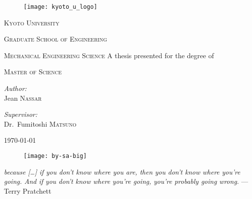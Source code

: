\begin{titlepage}
  \begin{center}
    \noindent

    \begin{figure}[h]
      \centering
      \texttt{[image: kyoto\_u\_logo]}
    \end{figure}
    \textsc{\LARGE Kyoto University}
    
    \textsc{\Large Graduate School of Engineering}

    \textsc{\large Mechanical Engineering Science}
    \vfill\vfill
    \textsc{\large \mytitle}  %
    \vfill\vfill
    {\large A thesis presented for the degree of}

    \textsc{\large Master of Science}
    \vfill\vfill
    \begin{minipage}[t]{0.4\textwidth}
      \begin{flushleft}
	\emph{Author:}\\
	Jean \textsc{Nassar}
      \end{flushleft}
    \end{minipage}
    \begin{minipage}[t]{0.4\textwidth}
      \begin{flushright}
	\emph{Supervisor:}\\
	Dr.~Fumitoshi \textsc{Matsuno}
      \end{flushright}
    \end{minipage}
    \vfill
    \today
    \begin{figure}[h]
      \centering
      \texttt{[image: by-sa-big]}
    \end{figure}
  \end{center}
\end{titlepage}

\thispagestyle{empty}
  \null{}
    \begin{flushright}
      \emph{
	because [\ldots] if you don't know where you are, then you don't know where you're going.
	And if you don't know where you're going, you're probably going wrong.
      } --- Terry Pratchett
    \end{flushright}
  \null

